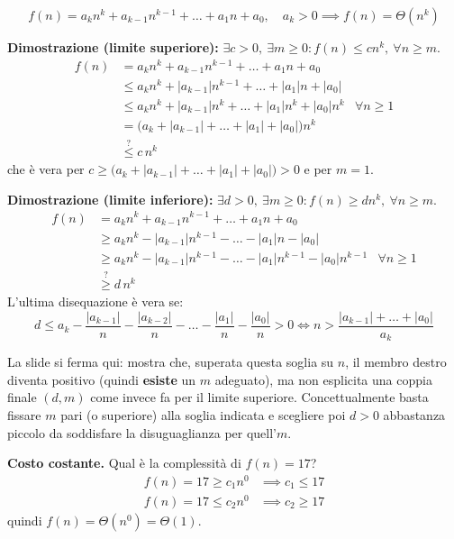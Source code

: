 \documentclass[12pt, a4paper]{article}
\begin{document}
\begin{tcolorbox}[colback=lightergray!10, colframe=tocsec, title=\textbf{Proprietà: Espressioni Polinomiali}]
\label{prop:polinomi-theta}
$$f(n) = a_kn^k + a_{k-1}n^{k-1} + \ldots + a_1n + a_0,\quad a_k > 0 \implies f(n) = \Theta(n^k)$$
\end{tcolorbox}

\textbf{Dimostrazione (limite superiore):} $\exists c>0,\ \exists m\ge0 : f(n)\le cn^k,\ \forall n\ge m$.
\begin{align*}
f(n) &= a_kn^k + a_{k-1}n^{k-1} + \ldots + a_1n + a_0 \\
     &\le a_kn^k + |a_{k-1}|n^{k-1} + \ldots + |a_1|n + |a_0| \\
     &\le a_kn^k + |a_{k-1}|n^k + \ldots + |a_1|n^k + |a_0|n^k & \forall n \ge 1 \\
     &= \big(a_k + |a_{k-1}| + \ldots + |a_1| + |a_0|\big)n^k \\
     &\overset{?}{\le} c\,n^k
\end{align*}
che è vera per $c \ge \big(a_k + |a_{k-1}| + \ldots + |a_1| + |a_0|\big) > 0$ e per $m=1$.

\textbf{Dimostrazione (limite inferiore):} $\exists d>0,\ \exists m\ge0 : f(n)\ge dn^k,\ \forall n\ge m$.
\begin{align*}
f(n) &= a_kn^k + a_{k-1}n^{k-1} + \ldots + a_1n + a_0 \\
     &\ge a_kn^k - |a_{k-1}|n^{k-1} - \ldots - |a_1|n - |a_0| \\
     &\ge a_kn^k - |a_{k-1}|n^{k-1} - \ldots - |a_1|n^{k-1} - |a_0|n^{k-1} & \forall n \ge 1 \\
     &\overset{?}{\ge} d\,n^k
\end{align*}
L'ultima disequazione è vera se:
$$d \le a_k - \frac{|a_{k-1}|}{n} - \frac{|a_{k-2}|}{n} - \ldots - \frac{|a_1|}{n} - \frac{|a_0|}{n} > 0 \iff n > \frac{|a_{k-1}| + \ldots + |a_0|}{a_k}$$

\begin{tcolorbox}[colback=lightergray!5, colframe=tocsubsec, title=\textbf{Nota}]
La slide si ferma qui: mostra che, superata questa soglia su $n$, il membro destro diventa positivo (quindi \textbf{esiste} un $m$ adeguato), ma non esplicita una coppia finale $(d,m)$ come invece fa per il limite superiore. Concettualmente basta fissare $m$ pari (o superiore) alla soglia indicata e scegliere poi $d>0$ abbastanza piccolo da soddisfare la disuguaglianza per quell'$m$.
\end{tcolorbox}

\textbf{Costo costante.} Qual è la complessità di $f(n) = 17$?
\begin{align*}
f(n) = 17 \ge c_1 n^0 &\implies c_1 \le 17 \\
f(n) = 17 \le c_2 n^0 &\implies c_2 \ge 17
\end{align*}
quindi $f(n) = \Theta(n^0) = \Theta(1)$.
\end{document}
